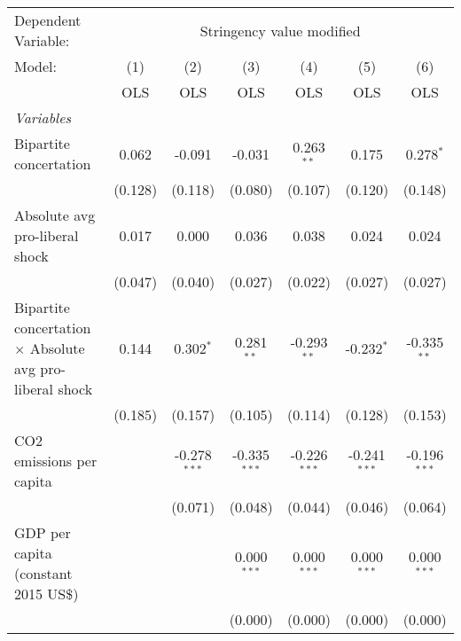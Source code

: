 
\begingroup
\centering
\begin{tabular}{lcccccc}
   \toprule
   Dependent Variable: & \multicolumn{6}{c}{Stringency value modified}\\
   Model:                                                          & (1)     & (2)            & (3)            & (4)            & (5)            & (6)\\  
                                                                   &  OLS    & OLS            & OLS            & OLS            & OLS            & OLS\\  
   \midrule
   \emph{Variables}\\
   Bipartite concertation                                          & 0.062   & -0.091         & -0.031         & 0.263$^{**}$   & 0.175          & 0.278$^{*}$\\   
                                                                   & (0.128) & (0.118)        & (0.080)        & (0.107)        & (0.120)        & (0.148)\\   
   Absolute avg pro-liberal shock                                  & 0.017   & 0.000          & 0.036          & 0.038          & 0.024          & 0.024\\   
                                                                   & (0.047) & (0.040)        & (0.027)        & (0.022)        & (0.027)        & (0.027)\\   
   Bipartite concertation $\times$ Absolute avg pro-liberal shock  & 0.144   & 0.302$^{*}$    & 0.281$^{**}$   & -0.293$^{**}$  & -0.232$^{*}$   & -0.335$^{**}$\\   
                                                                   & (0.185) & (0.157)        & (0.105)        & (0.114)        & (0.128)        & (0.153)\\   
   CO2 emissions per capita                                        &         & -0.278$^{***}$ & -0.335$^{***}$ & -0.226$^{***}$ & -0.241$^{***}$ & -0.196$^{***}$\\   
                                                                   &         & (0.071)        & (0.048)        & (0.044)        & (0.046)        & (0.064)\\   
   GDP per capita (constant 2015 US\$)                             &         &                & 0.000$^{***}$  & 0.000$^{***}$  & 0.000$^{***}$  & 0.000$^{***}$\\   
                                                                   &         &                & (0.000)        & (0.000)        & (0.000)        & (0.000)\\   

\end{tabular}

